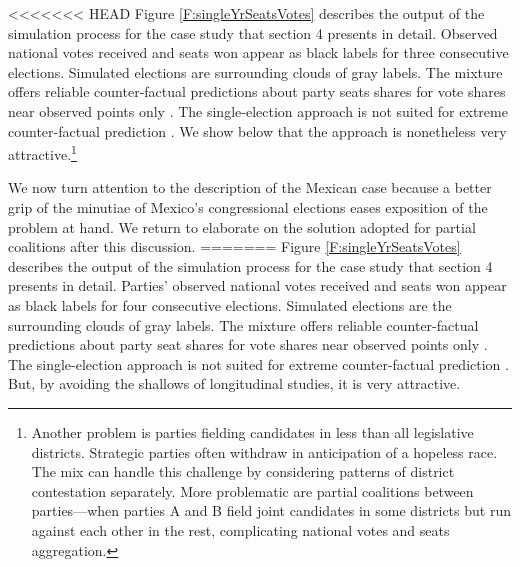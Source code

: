 \documentclass[letter,12pt]{article}
\begin{document}
<<<<<<< HEAD
Figure \ref{F:singleYrSeatsVotes} describes the output of the simulation process for the case study that section 4 presents in detail. Observed national votes received and seats won appear as black labels for three consecutive elections. Simulated elections are surrounding clouds of gray labels. The mixture offers reliable counter-factual predictions about party seats shares for vote shares near observed points only \citep[about $\pm10$ percent,][:fn.\ 8]{linzerSeatVoteElasticity2012}. The single-election approach is not suited for extreme counter-factual prediction \citep{gelman.king.1994EvalElSysRedis}. We show below that the approach is nonetheless very attractive.\footnote{Another problem is parties fielding candidates in less than all legislative districts. Strategic parties often withdraw in anticipation of a hopeless race. The mix can handle this challenge by considering patterns of district contestation separately. More problematic are partial coalitions between parties---when parties A and B field joint candidates in some districts but run against each other in the rest, complicating national votes and seats aggregation.}


We now turn attention to the description of the Mexican case because a better grip of the minutiae of Mexico's congressional elections eases exposition of the problem at hand. We return to elaborate on the solution adopted for partial coalitions after this discussion. 
=======
Figure \ref{F:singleYrSeatsVotes} describes the output of the simulation process for the case study that section 4 presents in detail. Parties' observed national votes received and seats won appear as black labels for four consecutive elections. Simulated elections are the surrounding clouds of gray labels. The mixture offers reliable counter-factual predictions about party seat shares for vote shares near observed points only \citep[about $\pm5$ percent,][:fn.\ 8]{linzerSeatVoteElasticity2012}. The single-election approach is not suited for extreme counter-factual prediction \citep[something generally true for any approach,][]{gelman.king.1994EvalElSysRedis}. But, by avoiding the shallows of longitudinal studies, it is very attractive.

\end{document}
